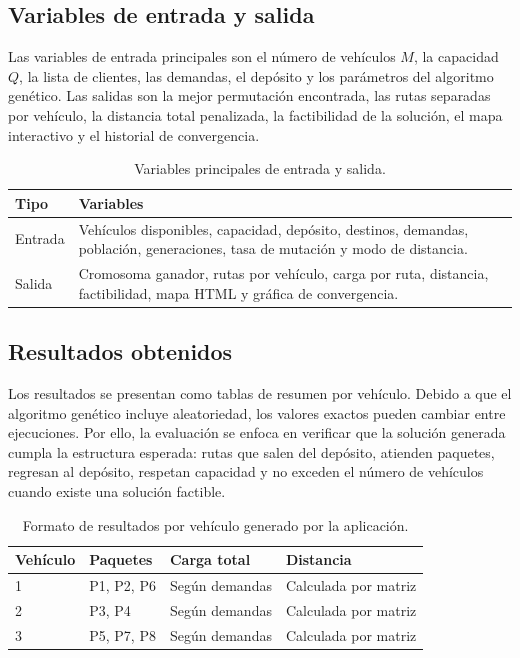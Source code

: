 \documentclass[runningheads]{llncs}
\begin{document}
\subsection{Variables de entrada y salida}

Las variables de entrada principales son el n\'umero de veh\'iculos $M$, la
capacidad $Q$, la lista de clientes, las demandas, el dep\'osito y los par\'ametros
del algoritmo gen\'etico. Las salidas son la mejor permutaci\'on encontrada, las
rutas separadas por veh\'iculo, la distancia total penalizada, la factibilidad de
la soluci\'on, el mapa interactivo y el historial de convergencia.

\begin{table}
\centering
\caption{Variables principales de entrada y salida.}\label{tab:variables}
\begin{tabular}{p{3.5cm}p{8cm}}
\toprule
Tipo & Variables \\
\midrule
Entrada & Veh\'iculos disponibles, capacidad, dep\'osito, destinos, demandas,
poblaci\'on, generaciones, tasa de mutaci\'on y modo de distancia. \\
Salida & Cromosoma ganador, rutas por veh\'iculo, carga por ruta, distancia,
factibilidad, mapa HTML y gr\'afica de convergencia. \\
\bottomrule
\end{tabular}
\end{table}

\subsection{Resultados obtenidos}

Los resultados se presentan como tablas de resumen por veh\'iculo. Debido a que
el algoritmo gen\'etico incluye aleatoriedad, los valores exactos pueden cambiar
entre ejecuciones. Por ello, la evaluaci\'on se enfoca en verificar que la
soluci\'on generada cumpla la estructura esperada: rutas que salen del dep\'osito,
atienden paquetes, regresan al dep\'osito, respetan capacidad y no exceden el
n\'umero de veh\'iculos cuando existe una soluci\'on factible.

\begin{table}
\centering
\caption{Formato de resultados por veh\'iculo generado por la aplicaci\'on.}
\label{tab:resultados}
\begin{tabular}{llll}
\toprule
Veh\'iculo & Paquetes & Carga total & Distancia \\
\midrule
1 & P1, P2, P6 & Seg\'un demandas & Calculada por matriz \\
2 & P3, P4 & Seg\'un demandas & Calculada por matriz \\
3 & P5, P7, P8 & Seg\'un demandas & Calculada por matriz \\
\bottomrule
\end{tabular}
\end{table}
\end{document}
